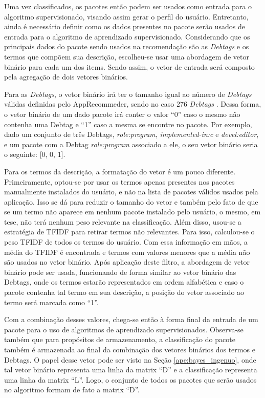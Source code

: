 Uma vez classificados, os pacotes então podem ser usados como entrada para o
algoritmo supervisionado, visando assim gerar o perfil do usuário.
Entretanto, ainda é necessário definir como os dados presentes no pacote serão usados de entrada para o
algoritmo de aprendizado supervisionado. Considerando que os principais dados do pacote sendo usados na
recomendação são as \textit{Debtags} e os termos que compõem sua descrição, escolheu-se usar uma abordagem de
vetor binário para cada um dos items. Sendo assim, o vetor de entrada será composto pela agregação de dois vetores
binários.

Para as \textit{Debtags}, o vetor binário irá ter o tamanho igual ao número de
\textit{Debtags} válidas definidas pelo AppRecommeder, sendo no caso 276
\textit{Debtags} \cite{araujo2011apprecommender}. Dessa forma,
o vetor binário de um dado pacote irá conter o valor ``0'' caso o mesmo não
contenha uma Debtag e ``1'' caso a mesma se encontre
no pacote. Por exemplo, dado um conjunto de três Debtags, \textit{role:program},
\textit{implemented-in:c} e \textit{devel:editor}, e um pacote com a Debtag
\textit{role:program} associado a ele, o seu vetor binário seria o seguinte: [0, 0, 1].

Para os termos da descrição, a formatação do vetor é um pouco diferente. Primeiramente, optou-se por usar os termos apenas presentes
nos pacotes manualmente instalados do usuário, e não na lista de pacotes válidos
usados pela aplicação. Isso se dá para reduzir o tamanho do vetor e também
pelo fato de que se um termo não aparece em nenhum pacote instalado pelo
usuário, o mesmo, em tese, não terá nenhum peso relevante na
classificação. Além disso, usou-se a estratégia de TFIDF para retirar termos não
relevantes. Para isso, calculou-se o peso TFIDF de todos os termos do usuário.
Com essa informação em mãos, a média do TFIDF é encontrada e termos com valores menores que a
média não são usados no vetor binário. Após aplicação deste filtro, a abordagem de vetor binário pode ser usada, funcionando de forma
similar ao vetor binário das Debtags, onde os termos estarão representados em ordem alfabética e caso o pacote contenha tal termo em sua
descrição, a posição do vetor associado ao termo será marcada como ``1''.

Com a combinação desses valores, chega-se então à forma final da entrada de um pacote para o uso de algoritmos de aprendizado
supervisionados. Observa-se também que para propósitos de armazenamento, a classificação do pacote também é armazenada ao final da combinação
dos vetores binários dos termos e Debtags. O papel desse vetor pode ser visto na
Seção \ref{ape:bayes_ingenuo}, onde tal vetor binário representa uma linha da
matrix ``D'' e a classificação representa uma linha da matrix ``L''. Logo, o
conjunto de todos os pacotes que serão usados no algoritmo formam de fato a
matrix ``D''.

